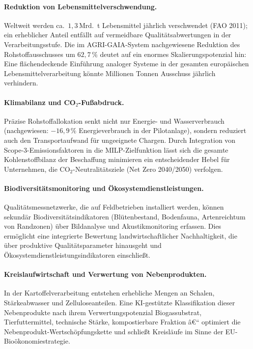 \documentclass[a4paper, 12pt, twoside, openright]{report}
\theoremstyle{definition}
\theoremstyle{definition}
\begin{document}
\paragraph{Reduktion von Lebensmittelverschwendung.}
Weltweit werden ca.\ $1{,}3\,\text{Mrd.}$~t Lebensmittel jährlich
verschwendet (FAO 2011); ein erheblicher Anteil entfällt auf
vermeidbare Qualitätsabwertungen in der Verarbeitungsstufe. Die im
AGRI-GAIA-System nachgewiesene Reduktion des Rohstoffausschusses um
$62{,}7\,\%$ deutet auf ein enormes Skalierungspotenzial hin: Eine
flächendeckende Einführung analoger Systeme in der gesamten
europäischen Lebensmittelverarbeitung könnte Millionen Tonnen
Ausschuss jährlich verhindern.

\paragraph{Klimabilanz und CO$_2$-Fußabdruck.}
Präzise Rohstoffallokation senkt nicht nur Energie- und
Wasserverbrauch (nachgewiesen: $-16{,}9\,\%$ Energieverbrauch in der
Pilotanlage), sondern reduziert auch den Transportaufwand für
ungeeignete Chargen. Durch Integration von Scope-3-Emissionsfaktoren
in die MILP-Zielfunktion lässt sich die gesamte Kohlenstoffbilanz
der Beschaffung minimieren ein entscheidender Hebel für
Unternehmen, die CO$_2$-Neutralitätsziele (Net Zero 2040/2050)
verfolgen.

\paragraph{Biodiversitätsmonitoring und Ökosystemdienstleistungen.}
Qualitäts\-messnetzwer\-ke, die auf Feldbetrieben installiert werden,
können sekundär Biodiversitätsindikatoren (Blütenbestand, Bodenfauna,
Artenreichtum von Randzonen) über Bildanalyse und Akustikmonitoring
erfassen. Dies ermöglicht eine integrierte Bewertung landwirtschaftlicher
Nachhaltigkeit, die über produktive Qualitätsparameter hinausgeht
und Ökosystemdienstleistungsindikatoren einschließt.

\paragraph{Kreislaufwirtschaft und Verwertung von Nebenprodukten.}
In der Kartoffelverarbeitung entstehen erhebliche Mengen an Schalen,
Stärkeabwasser und Zelluloseanteilen. Eine KI-gestützte Klassifikation
dieser Nebenprodukte nach ihrem Verwertungspotenzial Biogassubstrat,
Tierfuttermittel, technische Stärke, kompostierbare Fraktion â€“
optimiert die Nebenprodukt-Wertschöpfungskette und schließt
Kreisläufe im Sinne der EU-Bioökonomiestrategie.
\end{document}

